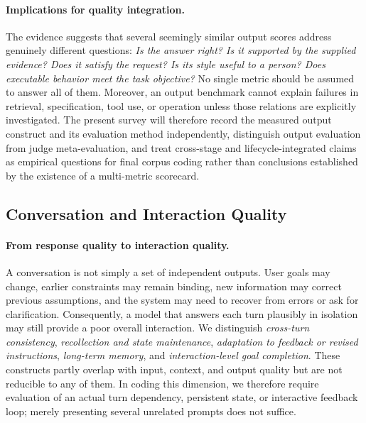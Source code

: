 \paragraph{Implications for quality integration.}
The evidence suggests that several seemingly similar output scores address genuinely different questions: \emph{Is the answer right? Is it supported by the supplied evidence? Does it satisfy the request? Is its style useful to a person? Does executable behavior meet the task objective?} No single metric should be assumed to answer all of them. Moreover, an output benchmark cannot explain failures in retrieval, specification, tool use, or operation unless those relations are explicitly investigated. The present survey will therefore record the measured output construct and its evaluation method independently, distinguish output evaluation from judge meta-evaluation, and treat cross-stage and lifecycle-integrated claims as empirical questions for final corpus coding rather than conclusions established by the existence of a multi-metric scorecard.

\subsection{Conversation and Interaction Quality}
\label{sec:conversation-quality}

\paragraph{From response quality to interaction quality.}
A conversation is not simply a set of independent outputs. User goals may change, earlier constraints may remain binding, new information may correct previous assumptions, and the system may need to recover from errors or ask for clarification. Consequently, a model that answers each turn plausibly in isolation may still provide a poor overall interaction. We distinguish \emph{cross-turn consistency}, \emph{recollection and state maintenance}, \emph{adaptation to feedback or revised instructions}, \emph{long-term memory}, and \emph{interaction-level goal completion}. These constructs partly overlap with input, context, and output quality but are not reducible to any of them. In coding this dimension, we therefore require evaluation of an actual turn dependency, persistent state, or interactive feedback loop; merely presenting several unrelated prompts does not suffice.


